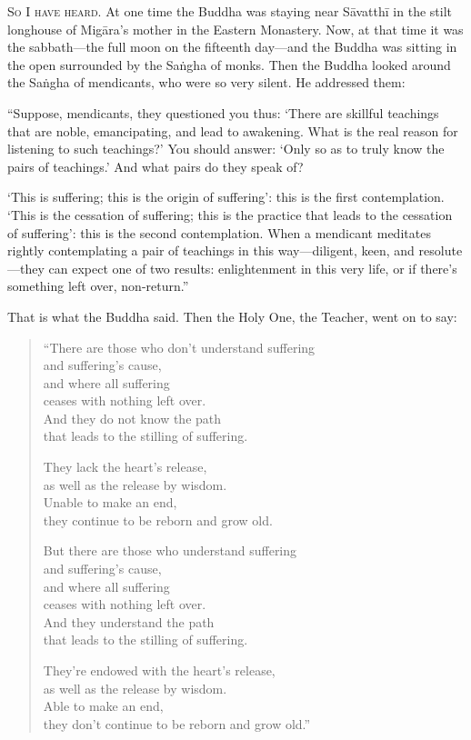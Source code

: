 \documentclass[12pt,openany]{book}%
\newcommand*{\scevam}[1]{\textsc{#1}}
\begin{document}
\scevam{So I have heard. }At one time the Buddha was staying near \textsanskrit{Sāvatthī} in the stilt longhouse of \textsanskrit{Migāra}’s mother in the Eastern Monastery. Now, at that time it was the sabbath—the full moon on the fifteenth day—and the Buddha was sitting in the open surrounded by the \textsanskrit{Saṅgha} of monks. Then the Buddha looked around the \textsanskrit{Saṅgha} of mendicants, who were so very silent. He addressed them: 

“Suppose, mendicants, they questioned you thus: ‘There are skillful teachings that are noble, emancipating, and lead to awakening. What is the real reason for listening to such teachings?’ You should answer: ‘Only so as to truly know the pairs of teachings.’ And what pairs do they speak of? 

‘This is suffering; this is the origin of suffering’: this is the first contemplation. ‘This is the cessation of suffering; this is the practice that leads to the cessation of suffering’: this is the second contemplation. When a mendicant meditates rightly contemplating a pair of teachings in this way—diligent, keen, and resolute—they can expect one of two results: enlightenment in this very life, or if there’s something left over, non-return.” 

That is what the Buddha said. Then the Holy One, the Teacher, went on to say: 

\begin{verse}%
“There are those who don’t understand suffering \\
and suffering’s cause, \\
and where all suffering \\
ceases with nothing left over. \\
And they do not know the path \\
that leads to the stilling of suffering. 

They lack the heart’s release, \\
as well as the release by wisdom. \\
Unable to make an end, \\
they continue to be reborn and grow old. 

But there are those who understand suffering \\
and suffering’s cause, \\
and where all suffering \\
ceases with nothing left over. \\
And they understand the path \\
that leads to the stilling of suffering. 

They’re endowed with the heart’s release, \\
as well as the release by wisdom. \\
Able to make an end, \\
they don’t continue to be reborn and grow old.” 

%
\end{verse}
\end{document}
